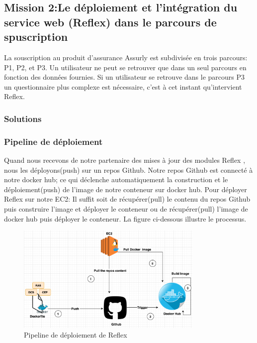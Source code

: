 \subsection{Mission 2:Le déploiement et l’intégration du service web (Reflex) dans le parcours de spuscription}
La souscription au produit d’assurance Assurly est subdivisée en trois parcours: P1, P2, et P3. Un utilisateur ne peut se
retrouver que dans un seul parcours en fonction des données fournies. Si un utilisateur se retrouve dans le
parcours P3 un questionnaire plus complexe est nécessaire, c’est à cet instant qu’intervient Reflex.

\subsubsection{Solutions}
\subsubsection{Pipeline de déploiement}
Quand nous recevons de notre partenaire des mises à jour des modules Reflex , nous les déployons(push) sur un repos Github. Notre repos Github est connecté à notre docker hub; ce qui déclenche automatiquement la construction et le déploiement(push) de l'image de notre conteneur sur docker hub. Pour déployer Reflex sur notre EC2: Il suffit soit de récupérer(pull) le contenu du repos Github puis construire l'image et déployer le conteneur ou de récupérer(pull) l'image de docker hub puis déployer le conteneur. La figure ci-dessous illustre le processus.  
 \begin{figure}[!th]
            \centering
                \includegraphics[width=0.8\textwidth]{Figures/pipeline1}
	       \decoRule
		\caption[Pipeline de déploiement de Reflex]{Pipeline de déploiement de Reflex}
	\label{fig:Pipeline de déploiement de Reflex}
\end{figure}

